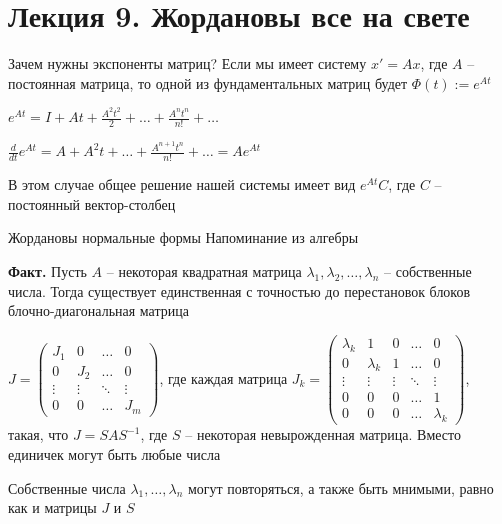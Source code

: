 \documentclass[12pt]{article}
\begin{document}
\newpage 

\section{Лекция 9. Жордановы все на свете}

\begin{nota}{Зачем нужны экспоненты матриц?}
    Если мы имеет систему $x' = Ax$, где $A$ -- постоянная матрица, то одной из фундаментальных матриц будет $\Phi(t) := e^{At}$

    $e^{At} = I + At + \frac{A^2t^2}{2} + \ldots + \frac{A^nt^n}{n!} + \ldots$

    $\frac{d}{dt}e^{At} = A + A^2t + \ldots + \frac{A^{n + 1}t^n}{n!} + \ldots = Ae^{At}$

    В этом случае общее решение нашей системы имеет вид $e^{At}C$, где $C$ -- постоянный вектор-столбец
\end{nota}

\begin{Reminder}{Жордановы нормальные формы}
    Напоминание из алгебры

    \textbf{Факт.} Пусть $A$ -- некоторая квадратная матрица $\lambda_1, \lambda_2, \ldots, \lambda_n$ -- собственные числа. Тогда существует единственная с точностью до перестановок блоков блочно-диагональная матрица 

    $J = \begin{pmatrix}
        J_1 & 0 & \ldots & 0 \\
        0 & J_2 & \ldots & 0 \\
        \vdots & \vdots & \ddots & \vdots \\
        0 & 0 & \ldots & J_m
    \end{pmatrix}$, где каждая матрица $J_k = \begin{pmatrix}
        \lambda_k & 1 & 0 & \ldots & 0 \\
        0 & \lambda_k & 1 & \ldots & 0 \\
        \vdots & \vdots & \vdots & \ddots & \vdots \\
        0 & 0 & 0 & \ldots & 1 \\
        0 & 0 & 0 & \ldots & \lambda_k
    \end{pmatrix}$, \\ такая, что $J = SAS^{-1}$, где $S$ -- некоторая невырожденная матрица. Вместо единичек могут быть любые числа 
\end{Reminder}

\begin{Remark}{}
    Собственные числа $\lambda_1, \ldots, \lambda_n$ могут повторяться, а также быть мнимыми, равно как и матрицы $J$ и $S$
\end{Remark}
\end{document}
